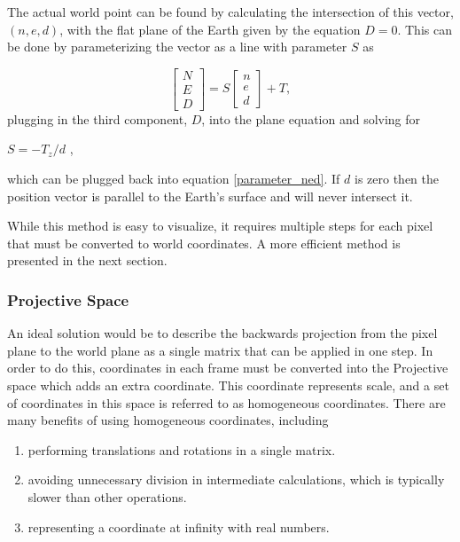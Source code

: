  The actual world point can be found by calculating the intersection of this vector, $(n,e,d)$, with the flat plane of the Earth given by the equation $D=0$.  This can be done by parameterizing the vector as a line with parameter $S$ as 
 
 \begin{equation}
 \label{parameter_ned}
 \begin{bmatrix} N \\ E \\ D \end{bmatrix} =
 S \begin{bmatrix} n \\ e \\ d \end{bmatrix}
 + T
 ,
 \end{equation}
 plugging in the third component, $D$, into the plane equation and solving for
 \begin{center}
 $S = -T_z / d$
 , 
 \end{center}
 which can be plugged back into equation \ref{parameter_ned}.  If $d$ is zero then the position vector is parallel to the Earth's surface and will never intersect it.   

 While this method is easy to visualize, it requires multiple steps for each pixel that must be converted to world coordinates.  A more efficient method is presented in the next section.

 \subsubsection{Projective Space}
 \label{section:projection_space}
 
 An ideal solution would be to describe the backwards projection from the pixel plane to the world plane as a single matrix that can be applied in one step.  In order to do this, coordinates in each frame must be converted into the Projective space which adds an extra coordinate.  This coordinate represents scale, and a set of coordinates in this space is referred to as homogeneous coordinates.  There are many benefits of using homogeneous coordinates, including
 \begin{enumerate}
 \item performing translations and rotations in a single matrix.
 \item avoiding unnecessary division in intermediate calculations, which is typically slower than other operations.
 \item representing a coordinate at infinity with real numbers.
 \end{enumerate}
 
